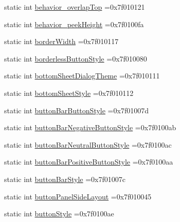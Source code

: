 \begin{DoxyCompactItemize}
\item 
static int \hyperlink{classandroid_1_1support_1_1v7_1_1cardview_1_1R_1_1attr_a3f74f7edc2044d09a9f4bf782fc271dc}{behavior\+\_\+overlap\+Top} =0x7f010121
\item 
static int \hyperlink{classandroid_1_1support_1_1v7_1_1cardview_1_1R_1_1attr_a31bb0e81ff71fbe4d22eecc92e1d48ce}{behavior\+\_\+peek\+Height} =0x7f0100fa
\item 
static int \hyperlink{classandroid_1_1support_1_1v7_1_1cardview_1_1R_1_1attr_abd8bb035dd15229b04ee77ac0ab202d1}{border\+Width} =0x7f010117
\item 
static int \hyperlink{classandroid_1_1support_1_1v7_1_1cardview_1_1R_1_1attr_a497f728b369f40e88879fcf873233148}{borderless\+Button\+Style} =0x7f010080
\item 
static int \hyperlink{classandroid_1_1support_1_1v7_1_1cardview_1_1R_1_1attr_a017f8091d4f249f077388e3d68476f2d}{bottom\+Sheet\+Dialog\+Theme} =0x7f010111
\item 
static int \hyperlink{classandroid_1_1support_1_1v7_1_1cardview_1_1R_1_1attr_a67ed112d398d6e373347557827c40fdd}{bottom\+Sheet\+Style} =0x7f010112
\item 
static int \hyperlink{classandroid_1_1support_1_1v7_1_1cardview_1_1R_1_1attr_ad41eb3028d5151ba75e3688b33611e57}{button\+Bar\+Button\+Style} =0x7f01007d
\item 
static int \hyperlink{classandroid_1_1support_1_1v7_1_1cardview_1_1R_1_1attr_a53796ccf1b5a88dc298dfaf30cf3e8db}{button\+Bar\+Negative\+Button\+Style} =0x7f0100ab
\item 
static int \hyperlink{classandroid_1_1support_1_1v7_1_1cardview_1_1R_1_1attr_ae12477d15a1f3158bd485a520e4096aa}{button\+Bar\+Neutral\+Button\+Style} =0x7f0100ac
\item 
static int \hyperlink{classandroid_1_1support_1_1v7_1_1cardview_1_1R_1_1attr_a1de975827f0146bb24d27f277bfabeef}{button\+Bar\+Positive\+Button\+Style} =0x7f0100aa
\item 
static int \hyperlink{classandroid_1_1support_1_1v7_1_1cardview_1_1R_1_1attr_ab1d867a0e1fdb554c96a74370d222077}{button\+Bar\+Style} =0x7f01007c
\item 
static int \hyperlink{classandroid_1_1support_1_1v7_1_1cardview_1_1R_1_1attr_ab3f73fc354c0fdde77226fff7a827c64}{button\+Panel\+Side\+Layout} =0x7f010045
\item 
static int \hyperlink{classandroid_1_1support_1_1v7_1_1cardview_1_1R_1_1attr_a3c726b0f612e7a0056b16b933edf2d12}{button\+Style} =0x7f0100ae
\item 

\end{DoxyCompactItemize}
